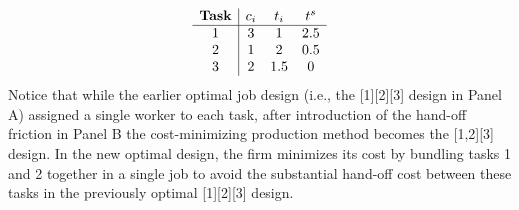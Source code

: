 \documentclass{article}
\theoremstyle{plain}
\theoremstyle{plain}
\begin{document}
\[
\begin{array}{c|ccc}
\textbf{Task} & c_{i} & t_{i} & t^{s}_{} \\ \hline
1 & 3  & 1   & 2.5 \\
2 & 1 & 2   & 0.5 \\
3 & 2   & 1.5 & 0 \\
\end{array}
\]
Notice that while the earlier optimal job design (i.e., the [1][2][3] design in Panel A) assigned a single worker to each task, after introduction of the hand-off friction in Panel B the cost-minimizing production method becomes the [1,2][3] design.
In the new optimal design, the firm minimizes its cost by bundling tasks 1 and 2 together in a single job to avoid the substantial hand-off cost between these tasks in the previously optimal [1][2][3] design.
\end{document}
